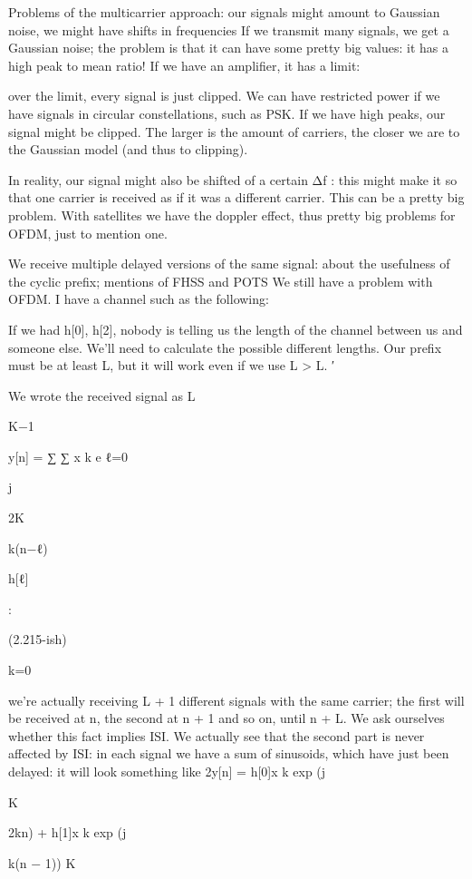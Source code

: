 {Problems of the multicarrier approach: our signals might amount to Gaussian noise, we might have shifts in frequencies If we transmit many signals, we get a Gaussian noise; the problem is that it can have some pretty big values: it has a high peak to mean ratio!
If we have an amplifier, it has a limit:

over the limit, every signal is just clipped.
We can have restricted power if we have signals in circular constellations, such as PSK.
If we have high peaks, our signal might be clipped.
The larger is the amount of carriers, the closer we are to the Gaussian model (and thus to clipping).

In reality, our signal might also be shifted of a certain Δf : this might make it so that one carrier is received as if it was a different carrier. This can be a pretty big problem.
With satellites we have the doppler effect, thus pretty big problems for OFDM, just to mention one.

We receive multiple delayed versions of the same signal: about the usefulness of the cyclic prefix; mentions of FHSS and POTS We still have a problem with OFDM.
I have a channel such as the following:

If we had h[0], h[2], nobody is telling us the length of the channel between us and someone else.
We'll need to calculate the possible different lengths.
Our prefix must be at least L, but it will work even if we use L > L.
′

We wrote the received signal as L

K−1

y[n] = ∑ ∑ x k e ℓ=0

j

2\pi K

k(n−ℓ)

h[ℓ]

:

(2.215-ish)

k=0

we're actually receiving L + 1 different signals with the same carrier; the first will be received at n, the second at n + 1 and so on, until n + L.
We ask ourselves whether this fact implies ISI.
We actually see that the second part is never affected by ISI: in each signal we have a sum of sinusoids, which have just been delayed: it will look something like 2\pi y[n] = h[0]x k exp (j

K

2\pi kn) + h[1]x k exp (j

k(n − 1))
K

}
